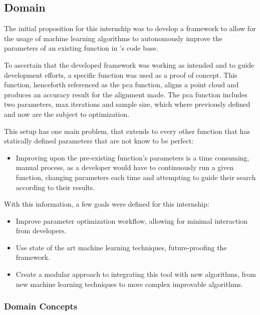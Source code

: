 
\subsection{Domain}

The initial proposition for this internship was to develop a framework to allow for the usage of machine learning algorithms to autonomously improve the parameters of an existing function in \faro's code base.

To ascertain that the developed framework was working as intended and to guide development efforts, a specific function was used as a proof of concept. This function, henceforth referenced as the \acrfull{pca} function, aligns a point cloud and produces an accuracy result for the alignment made. The \acrshort{pca} function includes two parameters, max iterations and sample size, which where previously defined and now are the subject to optimization.

This setup has one main problem, that extends to every other function that has statically defined parameters that are not know to be perfect:

\begin{itemize}
	\item Improving upon the pre-existing function's parameters is a time consuming, manual process, as a developer would have to continuously run a given function, changing parameters each time and attempting to guide their search according to their results.
\end{itemize}

With this information, a few goals were defined for this internship:

\begin{itemize}
	\item Improve parameter optimization workflow, allowing for minimal interaction from developers.
	\item Use state of the art machine learning techniques, future-proofing the framework.
	\item Create a modular approach to integrating this tool with new algorithms, from new machine learning techniques to more complex improvable algorithms.
\end{itemize}

\subsubsection{Domain Concepts}

